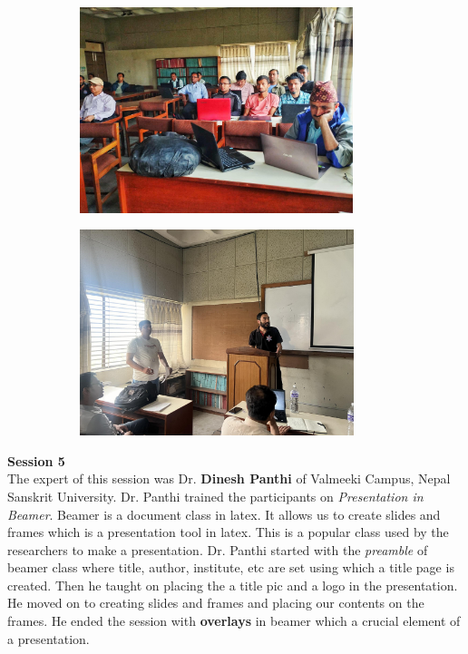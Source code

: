 \documentclass[a4paper,12pt]{report}
\begin{document}
\begin{figure}[h!]
\centering
\begin{subfigure}{0.48\textwidth}
    \includegraphics[height=6cm, width=\textwidth]{santosh.jpg}
\end{subfigure}
\hfill
\begin{subfigure}{0.48\textwidth}
    \includegraphics[height=6cm, width=\textwidth]{sandesh2.jpg}
\end{subfigure}
\end{figure}

\vspace{7mm}
{\bfseries \large Session 5}\\[3mm]
The expert of this session was Dr. \textbf{Dinesh Panthi} of Valmeeki Campus, Nepal Sanskrit University. Dr. Panthi trained the participants on \textit{Presentation in Beamer}. Beamer is a document class in latex. It allows us to create slides and frames which is a presentation tool in latex. This is a popular class used by the researchers to make a presentation. Dr. Panthi started with the \textit{preamble} of beamer class where title, author, institute, etc are set using which a title page is created. Then he taught on placing the a title pic and a logo in the presentation. He moved on to creating slides and frames and placing our contents on the frames. He ended the session with \textbf{overlays} in beamer which a crucial element of a presentation.
\clearpage
\end{document}
